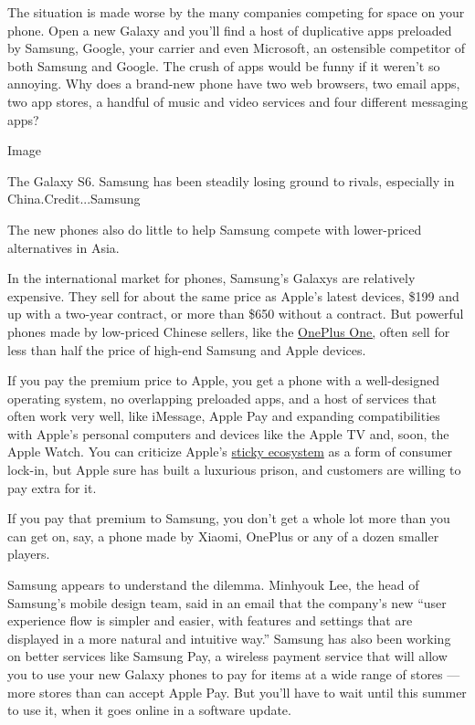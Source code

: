 The situation is made worse by the many companies competing for space on
your phone. Open a new Galaxy and you'll find a host of duplicative apps
preloaded by Samsung, Google, your carrier and even Microsoft, an
ostensible competitor of both Samsung and Google. The crush of apps
would be funny if it weren't so annoying. Why does a brand-new phone
have two web browsers, two email apps, two app stores, a handful of
music and video services and four different messaging apps?

Image

The Galaxy S6. Samsung has been steadily losing ground to rivals,
especially in China.Credit...Samsung

The new phones also do little to help Samsung compete with lower-priced
alternatives in Asia.

In the international market for phones, Samsung's Galaxys are relatively
expensive. They sell for about the same price as Apple's latest devices,
\$199 and up with a two-year contract, or more than \$650 without a
contract. But powerful phones made by low-priced Chinese sellers, like
the
\href{http://www.nytimes3xbfgragh.onion/2014/10/09/technology/personaltech/oneplus-one-review-high-hopes-for-low-price-phone.html?_r=0}{OnePlus
One,} often sell for less than half the price of high-end Samsung and
Apple devices.

If you pay the premium price to Apple, you get a phone with a
well-designed operating system, no overlapping preloaded apps, and a
host of services that often work very well, like iMessage, Apple Pay and
expanding compatibilities with Apple's personal computers and devices
like the Apple TV and, soon, the Apple Watch. You can criticize Apple's
\href{http://www.nytimes3xbfgragh.onion/2014/10/23/technology/personaltech/devices-with-yosemite-and-ios-8-operating-systems-seamlessly-connect-in-apples-ecosystem.html}{sticky
ecosystem} as a form of consumer lock-in, but Apple sure has built a
luxurious prison, and customers are willing to pay extra for it.

If you pay that premium to Samsung, you don't get a whole lot more than
you can get on, say, a phone made by Xiaomi, OnePlus or any of a dozen
smaller players.

Samsung appears to understand the dilemma. Minhyouk Lee, the head of
Samsung's mobile design team, said in an email that the company's new
``user experience flow is simpler and easier, with features and settings
that are displayed in a more natural and intuitive way.'' Samsung has
also been working on better services like Samsung Pay, a wireless
payment service that will allow you to use your new Galaxy phones to pay
for items at a wide range of stores --- more stores than can accept
Apple Pay. But you'll have to wait until this summer to use it, when it
goes online in a software update.

